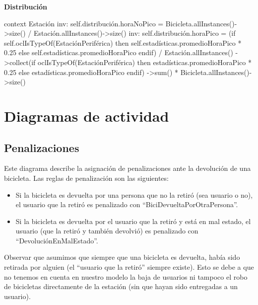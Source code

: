\documentclass[a4paper, 10pt, twoside]{article}
\newenvironment{ocl}[1]
  {
    \textbf{#1}
    \verbatim
  }{
    \endverbatim
  }
\begin{document}
\begin{ocl}{Distribución}
  context Estación
  inv: self.distribución.horaNoPico =
           Bicicleta.allInstances()->size() /
           Estación.allInstances()->size()
  inv: self.distribución.horaPico =
           (if self.oclIsTypeOf(EstaciónPeriférica) then
               self.estadísticas.promedioHoraPico * 0.25
           else
               self.estadísticas.promedioHoraPico
           endif) /
           Estación.allInstances()
               ->collect(if oclIsTypeOf(EstaciónPeriférica) then
                             estadísticas.promedioHoraPico * 0.25
                         else
                             estadísticas.promedioHoraPico
                         endif)
               ->sum() *
           Bicicleta.allInstances()->size()
\end{ocl}




\section{Diagramas de actividad}

\subsection{Penalizaciones}

Este diagrama describe la asignación de penalizaciones ante la devolución de una bicicleta. Las reglas de penalización son las siguientes:
\begin{itemize}
 \item Si la bicicleta es devuelta por una persona que no la retiró (sea usuario o no), el usuario que la retiró es penalizado con
 ``BiciDevueltaPorOtraPersona''.
 \item Si la bicicleta es devuelta por el usuario que la retiró y está en mal estado, el usuario (que la retiró y también devolvió) es penalizado
 con ``DevoluciónEnMalEstado''.
\end{itemize}
Observar que asumimos que siempre que una bicicleta es devuelta, había sido retirada por alguien (el ``usuario que la retiró'' siempre existe).
Esto se debe a que no tenemos en cuenta en nuestro modelo la baja de usuarios ni tampoco el robo de bicicletas directamente de la estación (sin que hayan sido entregadas a un usuario).
\end{document}

